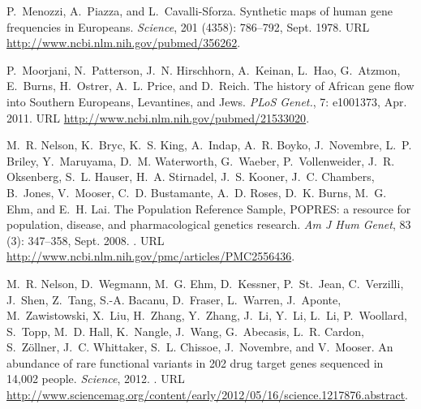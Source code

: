 \documentclass{article}
\begin{document}
\begin{thebibliography}{76}
P.~Menozzi, A.~Piazza, and L.~Cavalli-Sforza.
\newblock Synthetic maps of human gene frequencies in {Europeans}.
\newblock \emph{Science}, 201 (4358): 786--792, Sept. 1978.
\newblock URL \url{http://www.ncbi.nlm.nih.gov/pubmed/356262}.

P.~Moorjani, N.~Patterson, J.~N. Hirschhorn, A.~Keinan, L.~Hao, G.~Atzmon,
  E.~Burns, H.~Ostrer, A.~L. Price, and D.~Reich.
\newblock The history of {A}frican gene flow into {S}outhern {E}uropeans,
  {L}evantines, and {J}ews.
\newblock \emph{PLoS Genet.}, 7: e1001373, Apr. 2011.
\newblock URL \url{http://www.ncbi.nlm.nih.gov/pubmed/21533020}.

M.~R. Nelson, K.~Bryc, K.~S. King, A.~Indap, A.~R. Boyko, J.~Novembre, L.~P.
  Briley, Y.~Maruyama, D.~M. Waterworth, G.~Waeber, P.~Vollenweider, J.~R.
  Oksenberg, S.~L. Hauser, H.~A. Stirnadel, J.~S. Kooner, J.~C. Chambers,
  B.~Jones, V.~Mooser, C.~D. Bustamante, A.~D. Roses, D.~K. Burns, M.~G. Ehm,
  and E.~H. Lai.
\newblock The {Population} {Reference} {Sample}, {POPRES}: a resource for
  population, disease, and pharmacological genetics research.
\newblock \emph{Am J Hum Genet}, 83 (3): 347--358, Sept.
  2008.
\newblock {}.
\newblock URL \url{http://www.ncbi.nlm.nih.gov/pmc/articles/PMC2556436}.

M.~R. Nelson, D.~Wegmann, M.~G. Ehm, D.~Kessner, P.~St.~Jean, C.~Verzilli,
  J.~Shen, Z.~Tang, S.-A. Bacanu, D.~Fraser, L.~Warren, J.~Aponte,
  M.~Zawistowski, X.~Liu, H.~Zhang, Y.~Zhang, J.~Li, Y.~Li, L.~Li, P.~Woollard,
  S.~Topp, M.~D. Hall, K.~Nangle, J.~Wang, G.~Abecasis, L.~R. Cardon,
  S.~Zöllner, J.~C. Whittaker, S.~L. Chissoe, J.~Novembre, and V.~Mooser.
\newblock An abundance of rare functional variants in 202 drug target genes
  sequenced in 14,002 people.
\newblock \emph{Science}, 2012.
\newblock {}.
\newblock URL
  \url{http://www.sciencemag.org/content/early/2012/05/16/science.1217876.abstract}.


\end{thebibliography}
\end{document}
